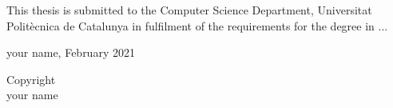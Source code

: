 \begin{dedication}



This thesis is submitted to the Computer Science Department, Universitat Polit\`ecnica de Catalunya in fulfilment of the requirements  for the degree in  ... 



\begin{center}
    

your name, February 2021 
\end{center}

\begin{center}
    

\vspace*{\fill}%

Copyright \textcopyright {} \\
your name

\end{center}









\end{dedication}



